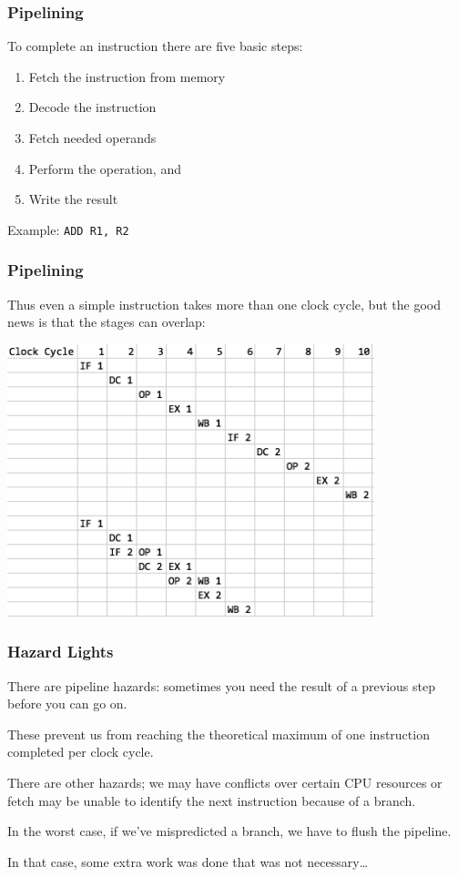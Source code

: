 \begin{frame}
\frametitle{Pipelining}

To complete an instruction there are five basic steps:
\begin{enumerate}
\item Fetch the instruction from memory
\item Decode the instruction
\item Fetch needed operands
\item Perform the operation, and 
\item Write the result
\end{enumerate}

Example: \texttt{ADD R1, R2}


\end{frame}



\begin{frame}
\frametitle{Pipelining}

Thus even a simple instruction takes more than one clock cycle, but the good news is that the stages can overlap:

\begin{center}
\includegraphics[width=0.8\textwidth]{images/pipelining}
\end{center}

\end{frame}


\begin{frame}
\frametitle{Hazard Lights}

There are pipeline hazards: sometimes you need the result of a previous step before you can go on. 

These prevent us from reaching the theoretical maximum of one instruction completed per clock cycle. 

There are other hazards; we may have conflicts over certain CPU resources or fetch may be unable to identify the next instruction because of a branch. 

In the worst case, if we've mispredicted a branch, we have to flush the pipeline. 

In that case, some extra work was done that was not necessary\ldots 

\end{frame}



